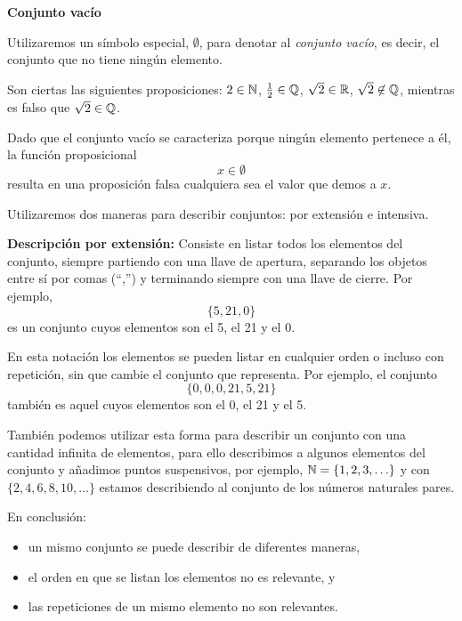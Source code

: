 \textbf{Conjunto vacío}

Utilizaremos un símbolo especial, $\emptyset$, para denotar
al \emph{conjunto vac\'io}, es decir, el conjunto que no tiene ning\'un elemento.

\medskip 

\begin{ejemplo}
	Son ciertas las siguientes
	proposiciones: $2 \in \mathbb{N}$, $\frac 1 2 \in \mathbb{Q}$, 
	$\sqrt{2} \in \mathbb{R}$, $\sqrt{2} \not \in \mathbb{Q}$,
	mientras es falso que $\sqrt{2}\in \mathbb{Q}$.
	
	Dado que el conjunto vacío se caracteriza porque ningún elemento pertenece a 
	\'el, la funci\'on proposicional 	
	$$x\in\emptyset$$	
	resulta en una proposici\'on falsa cualquiera sea el valor que demos a $x$.	
\end{ejemplo}

\medskip 


Utilizaremos dos maneras para describir conjuntos: por extensi\'on e intensiva.

\medskip 


\textbf{Descripci\'on por extensión:} Consiste en listar todos 
los elementos del conjunto, 
siempre partiendo con una llave de apertura, 
separando los objetos entre sí por comas (``,'')
y terminando siempre con una llave de cierre.
Por ejemplo,
$$\{ 5, 21, 0\}$$
es un conjunto cuyos elementos son el 5, el 21 y el 0.

En esta notación los elementos se pueden listar en cualquier orden o incluso con repetición, sin que cambie el conjunto que representa.
Por ejemplo, el conjunto
$$\{0,0,0,21,5,21\}$$
tambi\'en es aquel cuyos elementos son el 0, el 21 y el 5.

Tambi\'en podemos utilizar esta forma para describir un conjunto
con una cantidad infinita de elementos, para ello
describimos a algunos elementos del conjunto y
a\~nadimos puntos suspensivos, por ejemplo,
$\mathbb{N}= \{1,2,3,\ldots\}$ y con
$\{2,4,6,8,10,\ldots\}$ estamos describiendo al conjunto
de los n\'umeros naturales pares. 

En conclusión:
\begin{itemize}
	\item un mismo conjunto se puede describir de diferentes maneras,
	\item el orden en que se listan los elementos no es relevante, y
	\item las repeticiones de un mismo elemento no son relevantes.
\end{itemize}

\medskip 



